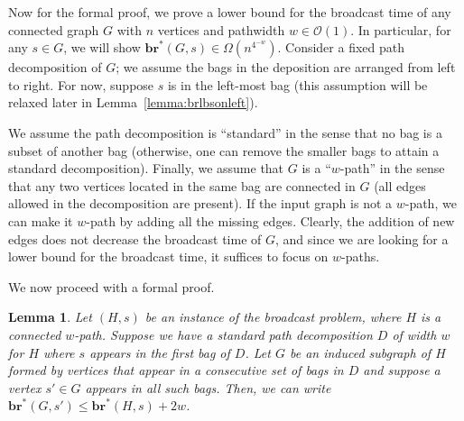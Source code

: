 \documentclass[letterpaper,11pt]{article}
\newtheorem{lemma}[theorem]{Lemma}
\newcommand{\bropt}{{\boldsymbol{br}^*}}
\newcommand{\oh}{\mathcal{O}}
\newcommand{\pwidth}{w}
\begin{document}
Now for the formal proof, we prove a lower bound for the broadcast time of any connected graph $G$ with $n$ vertices and pathwidth $\pwidth \in \oh(1)$. In particular, for any $s\in G$, we will show $\bropt(G,s) \in \Omega(n^{4^{-\pwidth}})$.
Consider a fixed path decomposition of $G$; we assume the bags in the deposition are arranged from left to right. For now, suppose $s$ is in the left-most bag (this assumption will be relaxed later in Lemma~\ref{lemma:brlbsonleft}). 

We assume the path decomposition is ``standard'' in the sense that no bag is a subset of another bag (otherwise, one can remove the smaller bags to attain a standard decomposition). Finally, we assume that $G$ is a ``$\pwidth$-path'' in the sense that any two vertices located in the same bag are connected in $G$ (all edges allowed in the decomposition are present). If the input graph is not a $\pwidth$-path, we can make it $\pwidth$-path by adding all the missing edges. Clearly, the addition of new edges does not decrease the broadcast time of $G$, and since we are looking for a lower bound for the broadcast time, it suffices to focus on $\pwidth$-paths. 

We now proceed with a formal proof.

\begin{lemma}\label{lemma:br:inducedHG}
    Let $(H,s)$ be an instance of the broadcast problem, where $H$ is a connected $\pwidth$-path. Suppose we have a standard path decomposition $D$ of width $\pwidth$ for $H$ where $s$ appears in the first bag of $D$. Let $G$ be an induced subgraph of $H$ formed by vertices that appear in a consecutive set of bags in $D$ and suppose a vertex $s'\in G$ appears in all such bags. Then, we can write $\bropt(G,s') \leq \bropt(H,s)+2\pwidth$.
\end{lemma}
    
\end{document}

